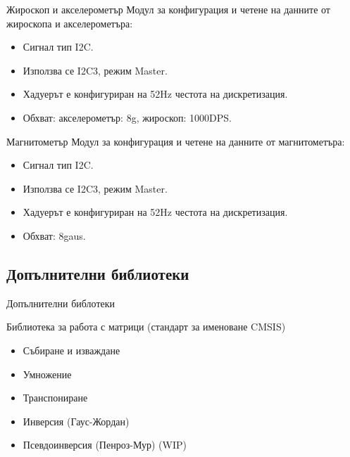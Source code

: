 \documentclass[handout]{beamer}
\begin{document}
\begin{frame}[t]
	\begin{block}{Жироскоп и акселерометър}
		Модул за конфигурация и четене на данните от жироскопа и акселерометъра:
		\begin{itemize}
			\item Сигнал тип I2C.
			\item Използва се I2C3, режим Master.
			\item Хадуерът е конфигуриран на 52Hz честота на дискретизация.
			\item Обхват: акселерометър: 8g, жироскоп: 1000DPS.
		\end{itemize}
	\end{block}
\end{frame}

\begin{frame}[t]
	\begin{block}{Магнитометър}
		Модул за конфигурация и четене на данните от магнитометъра:
		\begin{itemize}
			\item Сигнал тип  I2C.
			\item Използва се I2C3, режим Master.
			\item Хадуерът е конфигуриран на 52Hz честота на дискретизация.
			\item Обхват: 8gaus.
		\end{itemize}
	\end{block}
\end{frame}

\subsection{Допълнителни библиотеки}

\begin{frame}{Допълнителни библотеки}

	\begin{block}{Библиотека за работа с матрици (стандарт за именоване CMSIS)}
		\begin{itemize}
			\pause
			\item Събиране и изваждане
			\pause
			\item Умножение
			\pause
			\item Транспониране
			\pause
			\item Инверсия (Гаус-Жордан)
			\pause
			\item  Псевдоинверсия (Пенроз-Мур) (WIP)
		\end{itemize}
	\end{block}

\end{frame}
\end{document}
